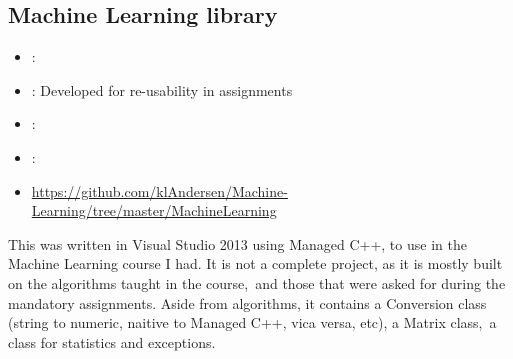 \subsection{Machine Learning library}
\label{sec:ml_library}
\begin{itemize} 
	\item {}: 
	\item {}: Developed for re-usability in assignments
	\item {}: 
	\item {}: 
	\item {} \url{https://github.com/klAndersen/Machine-Learning/tree/master/MachineLearning}
\end{itemize} 
This was written in Visual Studio 2013 using Managed C++, to use in the Machine Learning course I had. 
It is not a complete project, as it is mostly built on the algorithms taught in the course, and those that were asked for during the mandatory assignments. 
Aside from algorithms, it contains a Conversion class (string to numeric, naitive to Managed C++, vica versa, etc), a Matrix class, a class for statistics and exceptions.

